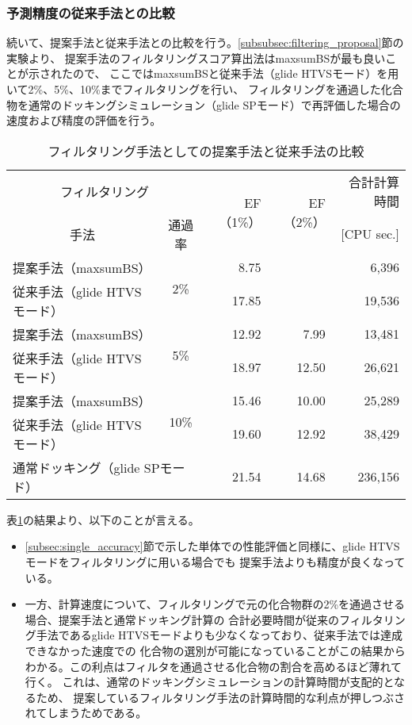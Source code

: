 \subsubsection{予測精度の従来手法との比較}\label{subsubsec:filtering_comparison}
続いて、提案手法と従来手法との比較を行う。\ref{subsubsec:filtering_proposal}節の実験より、
提案手法のフィルタリングスコア算出法はmaxsumBSが最も良いことが示されたので、
ここではmaxsumBSと従来手法（glide HTVSモード）を用いて2\%、5\%、10\%までフィルタリングを行い、
フィルタリングを通過した化合物を通常のドッキングシミュレーション（glide SPモード）で再評価した場合の
速度および精度の評価を行う。

\begin{table}[htb] \centering
	\caption{フィルタリング手法としての提案手法と従来手法の比較}
	\label{table:filtering_proposal_glide}
	\begin{tabular}{lc|rr|r|}
	\multicolumn{2}{c|}{フィルタリング}					&\multirow{2}{*}{EF（1\%）}	&\multirow{2}{*}{EF（2\%）}	&合計計算時間	\\
	\multicolumn{1}{c}{手法}		&通過率				&						&						&[CPU sec.]		\\ \hline
	提案手法（maxsumBS）		&\multirow{2}{*}{2\%}	&8.75					&\textendash				&6,396			\\
	従来手法（glide HTVSモード）	&					&17.85					&\textendash				&19,536			\\
	提案手法（maxsumBS）		&\multirow{2}{*}{5\%}	&12.92					&7.99					&13,481			\\
	従来手法（glide HTVSモード）	&					&18.97					&12.50					&26,621			\\
	提案手法（maxsumBS）		&\multirow{2}{*}{10\%}	&15.46					&10.00					&25,289			\\
	従来手法（glide HTVSモード）	&					&19.60					&12.92					&38,429			\\ \hline
	\multicolumn{2}{l|}{通常ドッキング（glide SPモード）}	&21.54					&14.68					&236,156			\\ \hline
	\end{tabular}
\end{table}

表\ref{table:filtering_proposal_glide}の結果より、以下のことが言える。
\begin{itemize}
\item \ref{subsec:single_accuracy}節で示した単体での性能評価と同様に、glide HTVSモードをフィルタリングに用いる場合でも
	提案手法よりも精度が良くなっている。
\item 一方、計算速度について、フィルタリングで元の化合物群の2\%を通過させる場合、提案手法と通常ドッキング計算の
	合計必要時間が従来のフィルタリング手法であるglide HTVSモードよりも少なくなっており、従来手法では達成できなかった速度での
	化合物の選別が可能になっていることがこの結果からわかる。この利点はフィルタを通過させる化合物の割合を高めるほど薄れて行く。
	これは、通常のドッキングシミュレーションの計算時間が支配的となるため、
	提案しているフィルタリング手法の計算時間的な利点が押しつぶされてしまうためである。
\end{itemize}